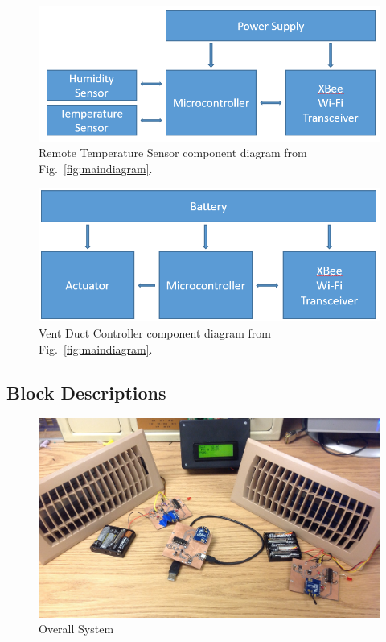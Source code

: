 \begin{figure}[htb]
\centering
\includegraphics[width=.9\textwidth]{RemotePanelDiagram.png}
\caption{Remote Temperature Sensor component diagram from Fig.~\ref{fig:maindiagram}.}
\label{fig:remotediagram}
\end{figure}

\begin{figure}[htb]
\centering
\includegraphics[width=.9\textwidth]{VentCntlDiagram.png}
\caption{Vent Duct Controller component diagram from Fig.~\ref{fig:maindiagram}.}
\label{fig:ventdiagram}
\end{figure}

\subsection{Block Descriptions}
\label{sect:blockdescriptions}

\begin{figure}
\centering
\includegraphics[width=.99\textwidth]{Overall_System.JPG}
\caption{Overall System}
\label{fig:Overall_System}
\end{figure}

